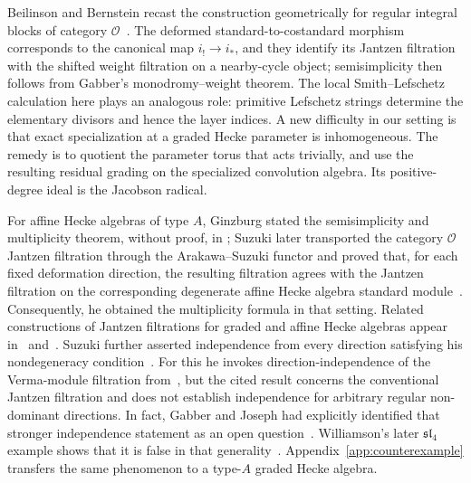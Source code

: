 \documentclass[11pt]{amsart}
\theoremstyle{definition}
\theoremstyle{remark}
\begin{document}
Beilinson and Bernstein recast the construction geometrically for regular
integral blocks of category $\mathcal O$~\cite{BeilinsonBernstein}.  The
deformed standard-to-costandard morphism corresponds to the canonical map
$i_!\to i_*$, and they identify its Jantzen filtration with the shifted
weight filtration on a nearby-cycle object; semisimplicity then follows from
Gabber's monodromy--weight theorem.  The local Smith--Lefschetz calculation here
plays an analogous role: primitive Lefschetz strings determine the
elementary divisors and hence the layer indices.  A new difficulty in our setting is that
exact specialization at a  graded Hecke parameter is
inhomogeneous.  The remedy is to quotient the parameter torus that acts trivially, and use the resulting residual grading on the specialized
convolution algebra. Its positive-degree ideal is the Jacobson radical.

For affine Hecke algebras of type $A$, Ginzburg
stated the semisimplicity and multiplicity theorem, without proof, in
\cite[Theorem~2.6.2]{GinzburgICM}; Suzuki later transported the category
$\mathcal O$ Jantzen filtration through the Arakawa--Suzuki functor and
proved that, for each fixed deformation direction, the resulting filtration
agrees with the Jantzen filtration on the corresponding degenerate affine
Hecke algebra standard module~\cite[Theorem~4.3.5]{Suzuki}.  Consequently, he obtained the multiplicity formula in that setting.
Related constructions of Jantzen filtrations for graded and affine Hecke
algebras appear in~\cite{Chan} and~\cite{FujitaHernandez}.
Suzuki further asserted independence from every direction satisfying his
nondegeneracy condition~\cite[Proposition~5.3.2]{Suzuki}.  For this he invokes
direction-independence of the Verma-module filtration from~\cite{Barbasch}, but
the cited result concerns the conventional Jantzen filtration and does not
establish independence for arbitrary regular non-dominant directions.
In fact, Gabber and Joseph had explicitly identified that stronger
independence statement as an open question~\cite[Section~4.2]{GabberJoseph}.
Williamson's later $\mathfrak{sl}_4$ example shows that it is false in that
generality~\cite[Sections~1.4 and~8.4]{WilliamsonLocal}.  %
Appendix~\ref{app:counterexample} transfers the same phenomenon to a type-$A$
graded Hecke algebra. 
\end{document}
